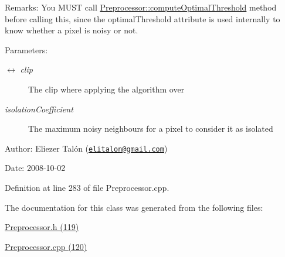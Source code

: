 \begin{Desc}
\item[Remarks:]You MUST call \hyperlink{class_preprocessor_84fcd2ccbbecea37f4bcdae5d7547ecd}{Preprocessor::computeOptimalThreshold} method before calling this, since the optimalThreshold attribute is used internally to know whether a pixel is noisy or not.\end{Desc}
\begin{Desc}
\item[Parameters:]
\begin{description}
\item[\mbox{$\leftrightarrow$} {\em clip}]The clip where applying the algorithm over \item[{\em isolationCoefficient}]The maximum noisy neighbours for a pixel to consider it as isolated\end{description}
\end{Desc}
\begin{Desc}
\item[Author:]Eliezer Talón (\href{mailto:elitalon@gmail.com}{\tt elitalon@gmail.com}) \end{Desc}
\begin{Desc}
\item[Date:]2008-10-02 \end{Desc}


Definition at line 283 of file Preprocessor.cpp.

The documentation for this class was generated from the following files:\begin{CompactItemize}
\item 
\hyperlink{_preprocessor_8h}{Preprocessor.h (119)}\item 
\hyperlink{_preprocessor_8cpp}{Preprocessor.cpp (120)}\end{CompactItemize}
